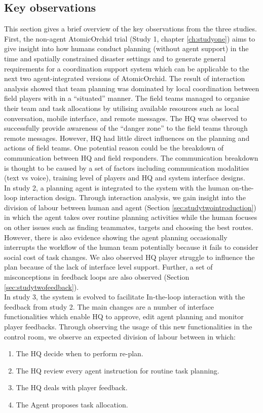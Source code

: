 \subsection{Key observations}\label{sec:conclusionOB}
This section gives a brief overview of the key observations from the three studies. First, the non-agent AtomicOrchid trial (Study 1, chapter \ref{ch:studyone}) aims to give insight into how humans conduct planning (without agent support) in the time and spatially constrained disaster settings and to generate general requirements for a coordination support system which can be applicable to the next two agent-integrated versions of AtomicOrchid. The result of interaction analysis showed that team planning was dominated by local coordination between field players with in a ``situated'' manner. The field teams managed to organise their team and task allocations by utilising available resources such as local conversation, mobile interface, and remote messages. The HQ was observed to successfully provide awareness of the ``danger zone'' to the field teams through remote messages. However, HQ had little direct influences on the planning and actions of field teams. One potential reason could be the breakdown of communication between HQ and field responders. The communication breakdown is thought to be caused by a set of factors including communication modalities (text vs voice), training level of players and HQ and system interface designs.  \\

In study 2, a planning agent is integrated to the system with the human on-the-loop interaction design.  Through interaction analysis, we gain insight into the division of labour between human and agent (Section \ref{sec:studytwointroduction}) in which the agent takes over routine planning activities while the human focuses on other issues such as finding teammates, targets and choosing the best routes. However, there is also evidence showing the agent planning occasionally interrupts the workflow of the human team potentially because it fails to consider social cost of task changes. We also observed HQ player struggle to influence the plan because of the lack of interface level support. Further, a set of misconceptions in feedback loops are also observed (Section \ref{sec:studytwofeedback}).\\

In study 3, the system is evolved to facilitate In-the-loop interaction with the feedback from study 2. The main changes are a number of interface functionalities which enable HQ to approve, edit agent planning and monitor player feedbacks. Through observing the usage of this new functionalities in the control room, we observe an expected division of labour between in which:
	\begin{enumerate}
	 \item The HQ decide when to perform re-plan.
	 \item The HQ review every agent instruction for routine task planning.
	 \item The HQ deals with player feedback.
	 \item The Agent proposes task allocation.
	\end{enumerate}
	
